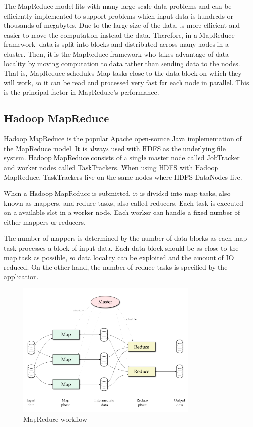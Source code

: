 The MapReduce model fits with many large-scale data problems and can be efficiently implemented to support problems which input data is hundreds or thousands of megabytes. Due to the large size of the data, is more efficient and easier to move the computation instead the data. Therefore, in a MapReduce framework, data is split into blocks and distributed across many nodes in a cluster. Then, it is the MapReduce framework who takes advantage of data locality by moving computation to data rather than sending data to the nodes. That is, MapReduce schedules Map tasks close to the data block on which they will work, so it can be read and processed very fast for each node in parallel. This is the principal factor in MapReduce's performance.

\subsection{Hadoop MapReduce}


Hadoop MapReduce \cite{ApacheHadoop} \cite{white2012hadoop} is the popular Apache open-source Java implementation of the MapReduce model. It is always used with HDFS as the underlying file system. Hadoop MapReduce consists of a single master node called JobTracker and worker nodes called TaskTrackers. When using HDFS with Hadoop MapReduce, TaskTrackers live on the same nodes where HDFS DataNodes live.
\par
When a Hadoop MapReduce is submitted, it is divided into map tasks, also known as mappers, and reduce tasks, also called reducers. Each task is executed on a available slot in a worker node. Each worker can handle a fixed number of either mappers or reducers.
\par
The number of mappers is determined by the number of data blocks as each map task processes a block of input data. Each data block should be as close to the map task as possible, so data locality can be exploited and the amount of IO reduced. On the other hand, the number of reduce tasks is specified by the application.

\begin{figure}[htb]
\centering
\includegraphics[width=0.8\textwidth]{./images/mapReduceModel.png}
\caption{MapReduce workflow} \label{fig:mapreducemodel}
\end{figure}


